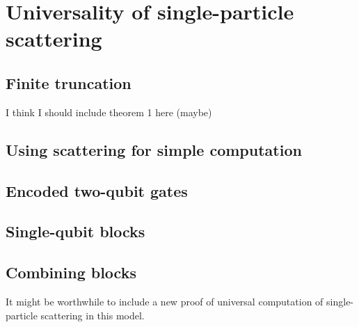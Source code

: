 % 

\chapter{Universality of single-particle scattering}

\section{Finite truncation}

I think I should include theorem 1 here (maybe)

\section{Using scattering for simple computation}


\section{Encoded two-qubit gates}
\section{Single-qubit blocks}
\section{Combining blocks}

It might be worthwhile to include a new proof of universal computation of single-particle scattering in this model.